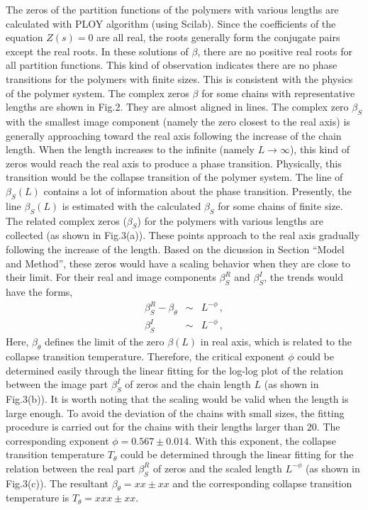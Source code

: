 \documentclass[preprint,preprintnumbers,amsmath,amssymb,showpacs,aps,pre]{revtex4-1}
\begin{document}
The zeros of the partition functions of the polymers with various lengths are
calculated with PLOY algorithm (using Scilab). Since the coefficients of the
equation $Z(s)=0$ are all real, the roots generally form the conjugate pairs
except the real roots. In these solutions of $\beta$, there are no positive
real roots for all partition functions. This kind of observation indicates
there are no phase transitions for the polymers with finite sizes. This is
consistent with the physics of the polymer system. The complex zeros $\beta$
for some chains with representative lengths are shown in Fig.2. They are
almost aligned in lines. The complex zero $\beta_S$ with the smallest image
component (namely the zero closest to the real axis) is generally approaching
toward the real axis following the increase of the chain length. When the
length increases to the infinite (namely $L\rightarrow\infty$), this kind of
zeros would reach the real axis to produce a phase transition. Physically,
this transition would be the collapse transition of the polymer system. The
line of $\beta_S(L)$ contains a lot of information about the phase transition.
Presently, the line $\beta_S(L)$ is estimated with the calculated $\beta_S$
for some chains of finite size. The related complex zeros ($\beta_S$) for the
polymers with various lengths are collected (as shown in Fig.3(a)). These
points approach to the real axis gradually following the increase of the
length. Based on the dicussion in Section ``Model and Method'', these zeros
would have a scaling behavior when they are close to their limit. For their
real and image components $\beta_S^R$ and $\beta_S^I$, the trends would have
the forms,
\begin{eqnarray}
\beta_S^R - \beta_{\theta}  &\sim&  L^{-\phi} \, , \\
\beta_S^I  &\sim&  L^{-\phi} \, ,
\end{eqnarray}
Here,
$\beta_{\theta}$ defines the limit of the zero $\beta(L)$ in real axis, which
is related to the collapse transition temperature. Therefore, the critical
exponent $\phi$ could be determined easily through the linear fitting for the
log-log plot of the relation between the image part $\beta_S^I$ of zeros and
the chain length $L$ (as shown in Fig.3(b)). It is worth noting that the
scaling would be valid when the length is large enough. To avoid the deviation
of the chains with small sizes, the fitting procedure is carried out for the
chains with their lengths larger than $20$. The corresponding exponent
$\phi=0.567 \pm 0.014$. With this exponent, the collapse transition temperature
$T_{\theta}$ could be determined through the linear fitting for the relation
between the real part $\beta_S^R$ of zeros and the scaled length $L^{-\phi}$
(as shown in Fig.3(c)). The resultant $\beta_{\theta}=xx \pm xx$ and the
corresponding collapse transition temperature is $T_{\theta}=xxx \pm xx$.
\end{document}
